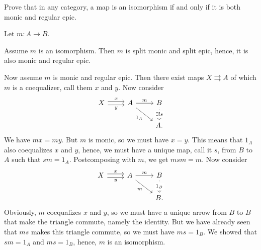 \documentclass[11pt,a4paper]{article}
\begin{document}
\begin{exercise}
    Prove that in any category, a map is an isomorphism if and only if it is both monic and regular epic.
\end{exercise}
\begin{solution}
    Let $m:A\to B$.\par 
    Assume $m$ is an isomorphism. Then $m$ is split monic and split epic, hence, it is also monic and regular epic.\par
    Now assume $m$ is monic and regular epic. Then there exist maps $X \rightrightarrows A$ of which $m$ is a coequalizer, call them $x$ and $y$. Now consider
    \begin{equation*}
    \begin{tikzcd}
        X \arrow[r, shift left, "x"] \arrow[r, shift right, "y"'] & A \arrow[r, "m"] \arrow[dr, "1_A"'] & B \arrow[d, dotted, "\exists !s"description] \\
                                                                  &&A.
    \end{tikzcd}
    \end{equation*}
    We have $mx=my$. But $m$ is monic, so we must have $x=y$. This means that $1_A$ also coequalizes $x$ and $y$, hence, we must have a unique map, call it $s$, from $B$ to $A$ such that $sm=1_A$. Postcomposing with $m$, we get $msm=m$. Now consider
    \begin{equation*}
    \begin{tikzcd}
        X \arrow[r, shift left, "x"] \arrow[r, shift right, "y"'] & A \arrow[r, "m"] \arrow[dr, "m"'] & B \arrow[d, dotted, "1_B"description] \\
                                                                  && B.
    \end{tikzcd}
    \end{equation*}
    Obviously, $m$ coequalizes $x$ and $y$, so we must have a unique arrow from $B$ to $B$ that make the triangle commute, namely the identity. But we have already seen that $ms$ makes this triangle commute, so we must have $ms=1_B$. We showed that $sm=1_A$ and $ms=1_B$, hence, $m$ is an isomorphism.
\end{solution}
\end{document}

